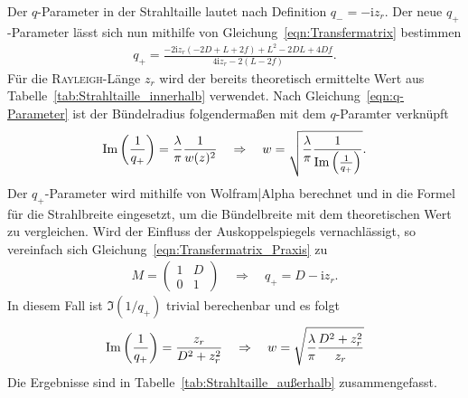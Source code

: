 \documentclass[a4paper,twoside,final]{article}
\begin{document}
Der $q$-Parameter in der Strahltaille lautet nach Definition $q_- = -\mathrm{i} z_r$. Der neue $q_+$-Parameter lässt sich nun mithilfe von Gleichung~\eqref{eqn:Transfermatrix} bestimmen
\begin{align}
  q_+ = \frac{-2\mathrm{i}z_r(-2D+L+2f) + L^2 -2DL + 4Df}{4\mathrm{i}z_r -2(L-2f)}.
\end{align}
Für die \textsc{Rayleigh}-Länge $z_r$ wird der bereits theoretisch ermittelte Wert aus Tabelle~\ref{tab:Strahltaille_innerhalb} verwendet.
Nach Gleichung~\eqref{eqn:q-Parameter} ist der Bündelradius folgendermaßen mit dem $q$-Paramter verknüpft
\begin{align}
  \Im\qty(\frac{1}{q_+}) = \frac{\lambda}{\pi}\frac{1}{w(z)^2} \quad \Rightarrow \quad w = \sqrt{\frac{\lambda}{\pi}\frac{1}{\Im\qty(\frac{1}{q_+})}}.
\end{align}
Der $q_+$-Parameter wird mithilfe von Wolfram|Alpha berechnet und in die Formel für die Strahlbreite eingesetzt, um die Bündelbreite mit dem theoretischen Wert zu vergleichen. Wird der Einfluss der Auskoppelspiegels vernachlässigt, so vereinfach sich Gleichung~\eqref{eqn:Transfermatrix_Praxis} zu
\begin{align}
  M = \begin{pmatrix}
  1 & D \\ 0 & 1
\end{pmatrix} \quad \Rightarrow \quad q_+ = D-\mathrm{i}z_r.
\end{align}
In diesem Fall ist $\Im(1/q_+)$ trivial berechenbar und es folgt
\begin{align}
    \Im\qty(\frac{1}{q_+}) = \frac{z_r}{D^2 + z_r^2} \quad \Rightarrow \quad w = \sqrt{\frac{\lambda}{\pi}\frac{D^2 + z_r^2}{z_r}}
\end{align}
Die Ergebnisse sind in Tabelle~\ref{tab:Strahltaille_außerhalb} zusammengefasst.
\end{document}
